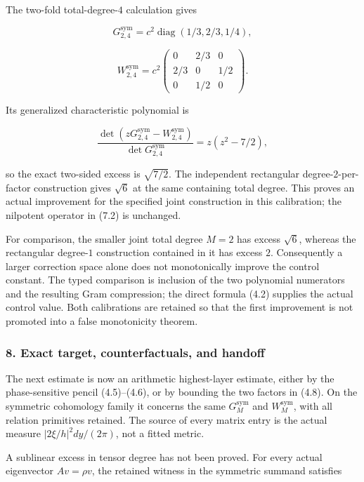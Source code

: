 The two-fold total-degree-\(4\) calculation gives

\[\boxed{G_{2,4}^{\mathrm{sym}}=c^2\operatorname{diag}(1/3,2/3,1/4),}\tag{7.3}\]

\[\boxed{W_{2,4}^{\mathrm{sym}}=c^2
\begin{pmatrix}0&2/3&0\\2/3&0&1/2\\0&1/2&0\end{pmatrix}.}\tag{7.4}\]

Its generalized characteristic polynomial is

\[\frac{\det(zG_{2,4}^{\mathrm{sym}}-W_{2,4}^{\mathrm{sym}})}{\det G_{2,4}^{\mathrm{sym}}}
=z(z^2-7/2),\]

so the exact two-sided excess is \(\sqrt{7/2}\). The independent
rectangular degree-\(2\)-per-factor construction gives \(\sqrt6\) at the
same containing total degree. This proves an actual improvement for the
specified joint construction in this calibration; the nilpotent operator
in (7.2) is unchanged.

For comparison, the smaller joint total degree \(M=2\) has excess
\(\sqrt6\), whereas the rectangular degree-\(1\) construction contained
in it has excess \(2\). Consequently a larger correction space alone
does not monotonically improve the control constant. The typed
comparison is inclusion of the two polynomial numerators and the
resulting Gram compression; the direct formula (4.2) supplies the actual
control value. Both calibrations are retained so that the first
improvement is not promoted into a false monotonicity theorem.

\subsubsection{8. Exact target, counterfactuals, and
handoff}\label{symmetric_frontier:exact-target-counterfactuals-and-handoff}

The next estimate is now an arithmetic highest-layer estimate, either by
the phase-sensitive pencil (4.5)--(4.6), or by bounding the two factors
in (4.8). On the symmetric cohomology family it concerns the same
\(G_M^{\mathrm{sym}}\) and \(W_M^{\mathrm{sym}}\), with all relation
primitives retained. The source of every matrix entry is the actual
measure \(|2\xi/h|^2dy/(2\pi)\), not a fitted metric.

A sublinear excess in tensor degree has not been proved. For every
actual eigenvector \(Av=\rho v\), the retained witness in the symmetric
summand satisfies

